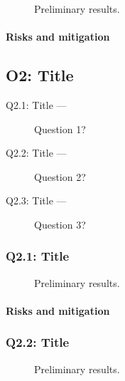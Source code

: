 \documentclass{nsf}
\begin{document}
\begin{wrapfigure}[14]{r}{.5\textwidth}
  \centering
  \caption{Preliminary results.}
  \label{fig:q13fig}
\end{wrapfigure}
\lipsum[1-3]
\paragraph{Risks and mitigation}
\lipsum[4]

\subsection{O2: Title}
\label{sec:o2}

\lipsum[1]

\begin{questions}
  \begin{description}
  \item[Q2.1: Title —] Question 1?
  \item[Q2.2: Title —] Question 2?
  \item[Q2.3: Title —] Question 3?
  \end{description}
\end{questions}

\subsubsection{Q2.1: Title}
\label{sec:q21}

\begin{wrapfigure}[14]{r}{.5\textwidth}
  \centering
  \caption{Preliminary results.}
  \label{fig:q21fig}
\end{wrapfigure}
\lipsum[1-3]
\paragraph{Risks and mitigation}
\lipsum[4]

\subsubsection{Q2.2: Title}
\label{sec:q22}

\begin{wrapfigure}[14]{r}{.5\textwidth}
  \centering
  \caption{Preliminary results.}
  \label{fig:q22fig}
\end{wrapfigure}
\lipsum[1-3]
\end{document}

